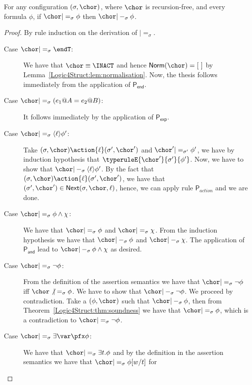 \begin{theorem}[Completeness]\label{Logic4Struct:thm:completeness}
  For any configuration $(\sigma,\chor)$, where $\chor$ is
  recursion-free, and every formula $\phi$, if $\chor|=_\sigma \phi$
  then $\chor|-_\sigma \phi$.
\end{theorem}
\begin{proof}
  By rule induction on the derivation of $|=_\sigma$.
   \begin{description}
   \item[Case $\chor |=_\sigma \endT$:] We have that $\chor \equiv
     \INACT$ and hence $\textsf{Norm}(\chor) = [\ ]$ by
     Lemma~\ref{Logic4Struct:lem:normalisation}. Now, the thesis follows immediately
     from the application of $ \mathsf{P_{end}}$.
   \item[Case $\chor |=_\sigma (e_1 @ A = e_2 @ B)$:] It follows
     immediately by the application of $\mathsf{P_{exp}}$.
   \item[Case $\chor |=_\sigma \langle \ell \rangle \phi'$:] Take
     $(\sigma, \chor) \action{\ell} (\sigma',\chor')$ and $\chor'
     |=_{\sigma'} \phi' $, we have by induction hypothesis that
     $\typeruleE{\chor'}{\sigma'}{\phi'}$. Now, we have to show that
     $\chor |-_\sigma \langle \ell \rangle \phi'$.  By the fact that
     $(\sigma, \chor) \action{\ell} (\sigma',\chor')$, we have that
     $(\sigma', \chor')\in \textsf{Next}(\sigma,\chor,\ell)$, hence, we
     can apply rule $\mathsf{P}_{action}$ and we are done.
   \item[Case $\chor |=_\sigma \phi \land \chi$:] We have that $\chor
     |=_\sigma \phi$ and $\chor |=_\sigma \chi$. From the induction
     hypothesis we have that $\chor |-_\sigma \phi$ and $ \chor
     |-_\sigma \chi$. The application of $\mathsf{P_{and}}$ lead to
     $\chor |-_\sigma \phi \land \chi$ as desired.
   \item[Case $\chor |=_\sigma \lnot \phi$:] From the definition of the
     assertion semantics we have that $\chor |=_\sigma \lnot \phi $ iff
     $\chor \not |=_\sigma \phi$. We have to show that $\chor |-_\sigma
     \lnot \phi$. We proceed by contradiction. Take a $(\phi, \chor)$
     such that $\chor |-_\sigma \phi$, then from
     Theorem~\ref{Logic4Struct:thm:soundness} we have that $\chor |=_\sigma \phi$,
     which is a contradiction to $\chor |=_\sigma \lnot \phi$.
   \item[Case $\chor |=_\sigma \exists \var \pfx \phi$:] We have that
     $\chor |=_\sigma \exists t. \phi$ and by the definition in the
     assertion semantics we have that $\chor |=_\sigma \phi [w/t]$ for

\end{description}
\end{proof}
